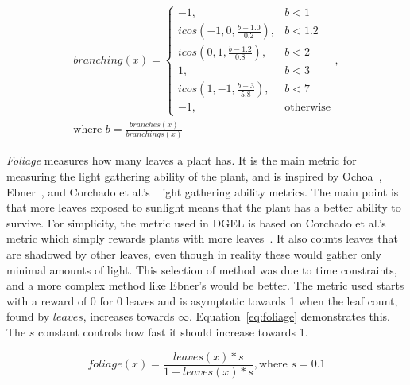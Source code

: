 \begin{equation}
\label{eq:complexity}
\begin{aligned}
    branching(x) =
    \begin{cases}
        -1, & b < 1 \\
        icos(-1, 0, \frac{b - 1.0}{0.2}), & b < 1.2 \\
        icos(0, 1, \frac{b - 1.2}{0.8}), & b < 2 \\
        1, & b < 3 \\
        icos(1, -1, \frac{b - 3}{5.8}), & b < 7 \\
        -1, & \text{otherwise}
    \end{cases}, \\
    \text{where } b = \frac{branches(x)}{branchings(x)}
\end{aligned}
\end{equation}

\textit{Foliage} measures how many leaves a plant has.
It is the main metric for measuring the light gathering ability of the plant, and is inspired by Ochoa~\cite{1998Ochoa}, Ebner~\cite{2003Ebner}, and Corchado et al.'s~\cite{2009Corchado} light gathering ability metrics.
The main point is that more leaves exposed to sunlight means that the plant has a better ability to survive.
For simplicity, the metric used in DGEL is based on Corchado et al.'s metric which simply rewards plants with more leaves~\cite{2009Corchado}.
It also counts leaves that are shadowed by other leaves, even though in reality these would gather only minimal amounts of light.
This selection of method was due to time constraints, and a more complex method like Ebner's would be better.
The metric used starts with a reward of 0 for 0 leaves and is asymptotic towards 1 when the leaf count, found by $leaves$, increases towards $\infty$.
Equation~\ref{eq:foliage} demonstrates this.
The $s$ constant controls how fast it should increase towards 1.

\begin{equation}
\label{eq:foliage}
    foliage(x) = \frac{leaves(x) * s}{1 + leaves(x) * s}, \text{where } s = 0.1
\end{equation}

